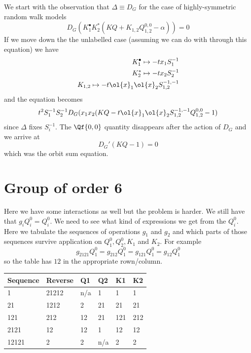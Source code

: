 We start with the observation that $\Delta \equiv D_G$ for the case of highly-symmetric random walk models
\[
	D_G(K_1^\bullet K_2^\ast(KQ + K_{1,2}Q_{1,2}^{0,0} - \alpha)) = 0
\]
If we move down the the unlabelled case (assuming we can do with through this equation) we have
\begin{align*}
	K_1^\bullet \mapsto - t x_1 S_1^{-1}\\
	K_2^\ast \mapsto - t x_2 S_2^{-1}\\
	K_{1,2} \mapsto - t \ol{x}_1\ol{x}_2 S_{1,2}^{-1,-1}
\end{align*}
and the equation becomes
\[
	t^2S_1^{-1}S_2^{-1}D_G(x_1x_2(KQ -t \ol{x}_1\ol{x}_2S_{1,2}^{-1,-1}Q_{1,2}^{0,0}-1)
\]
since $\Delta$ fixes $S_i^{-1}$. The $\Qf{0,0}$ quantity disappears after the action of $D_G$ and we arrive at
\[
	D_G'(KQ-1) = 0
\]
which was the orbit sum equation.
\section{Group of order 6}

Here we have some interactions as well but the problem is harder. We still have that $g_i Q_i^0 = Q_i^0$. We need to see what kind of expressions we get from the $Q_i^0$. Here we tabulate the sequences of operations $g_1$ and $g_2$ and which parts of those sequences survive application on $Q_1^0,Q_2^0, K_1$ and $K_2$. For example
\[
g_{2121}Q_1^0 = g_{212}Q_1^0 = g_{121} Q_1^0 = g_{12}Q_1^0
\]
so the table has $12$ in the appropriate rown/column.

\begin{center}
    \begin{tabular}{| l | l | l | l | l | l |}
    \hline
    Sequence & Reverse & Q1 & Q2 & K1 & K2 \\ \hline
    1 & 21212 & n/a & 1& 1& 1 \\ \hline
    21 &  1212& 2& 21 & 21& 21  \\ \hline
    121 & 212 & 12& 21& 121& 212 \\ \hline
    2121 & 12 &  12 & 1 & 12 & 12 \\ \hline
    12121 & 2 &  2& n/a& 2& 2 \\
    \hline
    \end{tabular}
\end{center}

